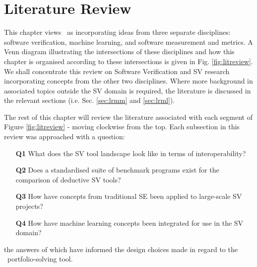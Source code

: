 \chapter{Literature Review}%
\thispagestyle{nohead}
\label{LitReview} %


This chapter views \where~as incorporating ideas from three separate disciplines: software verification, machine learning, and software measurement and metrics. 
A Venn diagram illustrating the intersections of these disciplines and how this chapter is organised according to these intersections is given in Fig. \ref{fig:litreview}. 
We shall concentrate this review on Software Verification and SV research incorporating concepts from the other two disciplines. 
Where more background in associated topics outside the SV domain is required, the literature is discussed in the relevant sections (i.e. Sec. \ref{sec:lrmm} and \ref{sec:lrml}).

The rest of this chapter will review the literature associated with each segment of Figure \ref{fig:litreview} - moving clockwise from the top. 
Each subsection in this review was approached with a question:
\begin{itemize}
	\item[\textbf{Q1}] What does the SV tool landscape look like in terms of interoperability?
	\item[\textbf{Q2}] Does a standardised suite of benchmark programs exist for the comparison of deductive SV tools?
	\item[\textbf{Q3}] How have concepts from traditional SE been applied to large-scale SV projects?
	\item[\textbf{Q4}] How have machine learning concepts been integrated for use in the SV domain?
\end{itemize}
the answers of which have informed the design choices made in regard to the \where~portfolio-solving tool.

